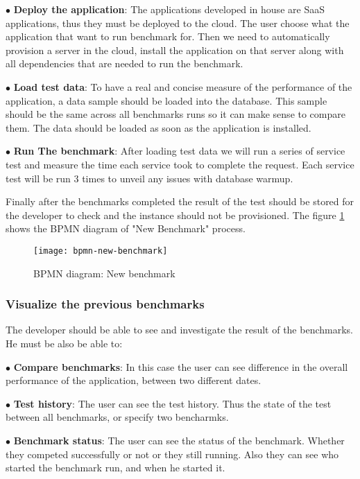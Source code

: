 $\bullet$ \textbf{Deploy the application}: The applications developed in house
are SaaS applications, thus they must be deployed to the cloud. The user choose
what the application that want to run benchmark for. Then we need to automatically
provision a server in the cloud, install the application on that server along
with all dependencies that are needed to run the benchmark.

$\bullet$ \textbf{Load test data}: To have a real and concise measure of the
performance of the application, a data sample should be loaded into the
database. This sample should be the same across all benchmarks runs so it can
make sense to compare them. The data should be loaded as soon as the application
is installed.

$\bullet$ \textbf{Run The benchmark}: After loading test data we will run a
series of service test and measure the time each service took to complete the
request. Each service test will be run 3 times to unveil any issues with
database warmup.

Finally after the benchmarks completed the result of the test should be stored
for the developer to check and the instance should not be provisioned. The figure
\hyperref[fig:bpmn-new-benchmark]{\ref{fig:bpmn-new-benchmark}} shows the BPMN diagram
of "New Benchmark" process.

\begin{figure}[h]
  \texttt{[image: bpmn-new-benchmark]}
\caption{BPMN diagram: New benchmark}
\label{fig:bpmn-new-benchmark}
\end{figure}

\subsubsection{Visualize the previous benchmarks}
The developer should be able to see and investigate the result of the
benchmarks. He must be also be able to:

$\bullet$ \textbf{Compare benchmarks}: In this case the user can see difference
in the overall performance of the application, between two different dates.

$\bullet$ \textbf{Test history}: The user can see the test history. Thus the
state of the test between all benchmarks, or specify two bencharmks.

$\bullet$ \textbf{Benchmark status}: The user can see the status of the
benchmark. Whether they competed successfully or not or they still running. Also
they can see who started the benchmark run, and when he started it.

